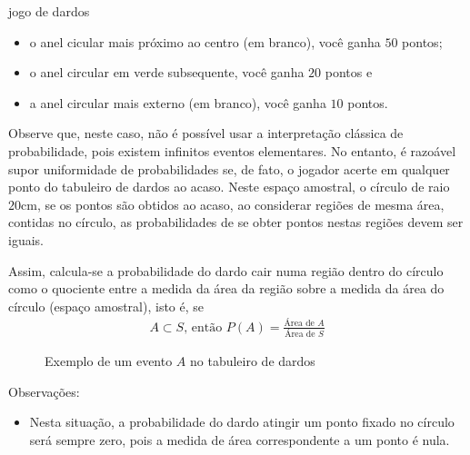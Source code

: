 \begin{task}{jogo de dardos}
\begin{itemize}
\item {} 
o anel cicular mais próximo ao centro (em branco), você ganha $50$ pontos;

\item {} 
o anel circular em verde subsequente, você ganha $20$ pontos e

\item {} 
a anel circular mais externo (em branco), você ganha $10$ pontos.

\end{itemize}


Observe que, neste caso, não é possível usar a interpretação clássica de probabilidade, pois existem infinitos eventos elementares. No entanto, é razoável supor uniformidade de probabilidades se, de fato, o jogador acerte em qualquer ponto do tabuleiro de dardos ao acaso. Neste espaço amostral, o círculo de raio $20$cm, se os pontos são obtidos ao acaso, ao considerar regiões de mesma área, contidas no círculo, as probabilidades de se obter pontos nestas regiões devem ser iguais.

Assim, calcula-se a probabilidade do dardo cair numa região dentro do círculo como o quociente entre a medida da área da região sobre a medida da área do círculo (espaço amostral), isto é, se
\begin{equation*}
\begin{split}A\subset S \text{, então } P(A)=\displaystyle{\frac{\text{Área de }A}{\text{Área de }S}}\end{split}
\end{equation*}

\begin{figure}[H]
\centering



\caption{Exemplo de um evento \(A\) no tabuleiro de dardos}
\end{figure}

Observações:
\begin{itemize}
\item {} 
Nesta situação, a probabilidade do dardo atingir um ponto fixado no círculo será sempre zero, pois a medida de área correspondente a um ponto é nula.


\end{itemize}
\end{task}
